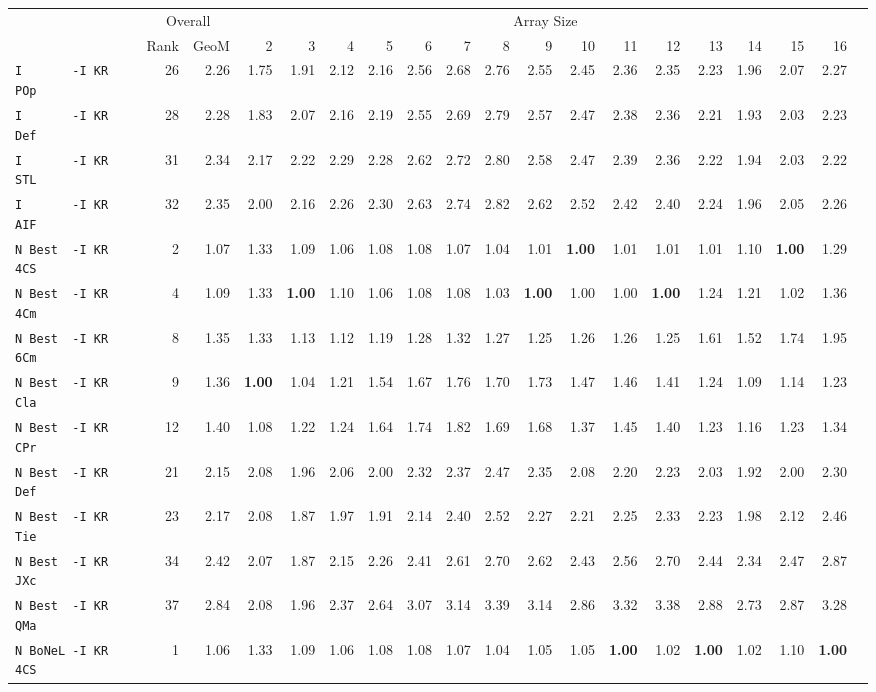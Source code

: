 \begin{tabular}{l | r @{~~} r | r@{~~}r@{~~}r@{~~}r@{~~}r@{~~}r@{~~}r@{~~}r@{~~}r@{~~}r@{~~}r@{~~}r@{~~}r@{~~}r@{~~}r@{~~}r|}
 & \multicolumn{2}{c}{Overall} & \multicolumn{15}{c}{Array Size} \\
 & Rank & GeoM & 2&3&4&5&6&7&8&9&10&11&12&13&14&15&16\\ \hline
\verb+I       -I KR POp+ & 26 & 2.26 & 1.75&1.91&2.12&2.16&2.56&2.68&2.76&2.55&2.45&2.36&2.35&2.23&1.96&2.07&2.27\\
\verb+I       -I KR Def+ & 28 & 2.28 & 1.83&2.07&2.16&2.19&2.55&2.69&2.79&2.57&2.47&2.38&2.36&2.21&1.93&2.03&2.23\\
\verb+I       -I KR STL+ & 31 & 2.34 & 2.17&2.22&2.29&2.28&2.62&2.72&2.80&2.58&2.47&2.39&2.36&2.22&1.94&2.03&2.22\\
\verb+I       -I KR AIF+ & 32 & 2.35 & 2.00&2.16&2.26&2.30&2.63&2.74&2.82&2.62&2.52&2.42&2.40&2.24&1.96&2.05&2.26\\
\verb+N Best  -I KR 4CS+ & 2 & 1.07 & 1.33&1.09&1.06&1.08&1.08&1.07&1.04&1.01&\textbf{1.00}&1.01&1.01&1.01&1.10&\textbf{1.00}&1.29\\
\verb+N Best  -I KR 4Cm+ & 4 & 1.09 & 1.33&\textbf{1.00}&1.10&1.06&1.08&1.08&1.03&\textbf{1.00}&1.00&1.00&\textbf{1.00}&1.24&1.21&1.02&1.36\\
\verb+N Best  -I KR 6Cm+ & 8 & 1.35 & 1.33&1.13&1.12&1.19&1.28&1.32&1.27&1.25&1.26&1.26&1.25&1.61&1.52&1.74&1.95\\
\verb+N Best  -I KR Cla+ & 9 & 1.36 & \textbf{1.00}&1.04&1.21&1.54&1.67&1.76&1.70&1.73&1.47&1.46&1.41&1.24&1.09&1.14&1.23\\
\verb+N Best  -I KR CPr+ & 12 & 1.40 & 1.08&1.22&1.24&1.64&1.74&1.82&1.69&1.68&1.37&1.45&1.40&1.23&1.16&1.23&1.34\\
\verb+N Best  -I KR Def+ & 21 & 2.15 & 2.08&1.96&2.06&2.00&2.32&2.37&2.47&2.35&2.08&2.20&2.23&2.03&1.92&2.00&2.30\\
\verb+N Best  -I KR Tie+ & 23 & 2.17 & 2.08&1.87&1.97&1.91&2.14&2.40&2.52&2.27&2.21&2.25&2.33&2.23&1.98&2.12&2.46\\
\verb+N Best  -I KR JXc+ & 34 & 2.42 & 2.07&1.87&2.15&2.26&2.41&2.61&2.70&2.62&2.43&2.56&2.70&2.44&2.34&2.47&2.87\\
\verb+N Best  -I KR QMa+ & 37 & 2.84 & 2.08&1.96&2.37&2.64&3.07&3.14&3.39&3.14&2.86&3.32&3.38&2.88&2.73&2.87&3.28\\
\verb+N BoNeL -I KR 4CS+ & 1 & 1.06 & 1.33&1.09&1.06&1.08&1.08&1.07&1.04&1.05&1.05&\textbf{1.00}&1.02&\textbf{1.00}&1.02&1.10&\textbf{1.00}\\

\end{tabular}
